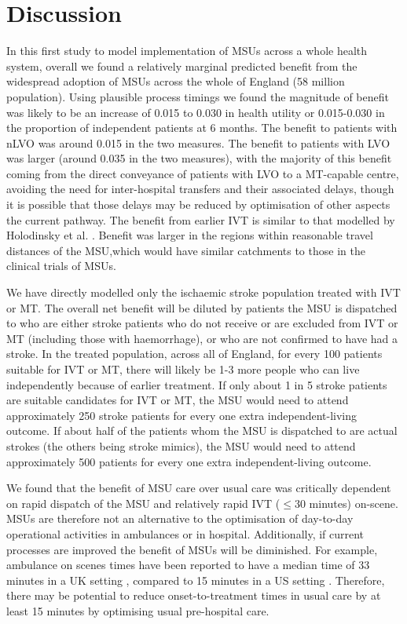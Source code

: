 \section{Discussion}


In this first study to model implementation of MSUs across a whole health system, overall we found a relatively marginal predicted benefit from the widespread adoption of MSUs across the whole of England (58 million population). Using plausible process timings we found the magnitude of benefit was likely to be an increase of 0.015 to 0.030 in health utility or 0.015-0.030 in the proportion of independent patients at 6 months. The benefit to patients with nLVO was around 0.015 in the two measures. The benefit to patients with LVO was larger (around 0.035 in the two measures), with the majority of this benefit coming from the direct conveyance of patients with LVO to a MT-capable centre, avoiding the need for inter-hospital transfers and their associated delays, though it is possible that those delays may be reduced by optimisation of other aspects the current pathway. The benefit from earlier IVT is similar to that modelled by Holodinsky et al. \cite{holodinsky_jessalyn_k_what_2020}. Benefit was larger in the regions within reasonable travel distances of the MSU,which would have similar catchments to those in the clinical trials of MSUs.

We have directly modelled only the ischaemic stroke population treated with IVT or MT. The overall net benefit will be diluted by patients the MSU is dispatched to who are either stroke patients who do not receive or are excluded from IVT or MT (including those with haemorrhage), or who are not confirmed to have had a stroke. In the treated population, across all of England, for every 100 patients suitable for IVT or MT, there will likely be 1-3 more people who can live independently because of earlier treatment. If only about 1 in 5 stroke patients are suitable candidates for IVT or MT, the MSU would need to attend approximately 250 stroke patients for every one extra independent-living outcome. If about half of the patients whom the MSU is dispatched to are actual strokes (the others being stroke mimics), the MSU would need to attend approximately 500 patients for every one extra independent-living outcome. 

We found that the benefit of MSU care over usual care was critically dependent on rapid dispatch of the MSU and relatively rapid IVT ($\leq$30 minutes) on-scene. MSUs are therefore not an alternative to the optimisation of day-to-day operational activities in ambulances or in hospital. Additionally, if current processes are improved the benefit of MSUs will be diminished. For example, ambulance on scenes times have been reported to have a median time of 33 minutes in a UK setting \cite{mcclelland_what_2023}, compared to 15 minutes in a US setting \cite{patel_evaluation_2014}. Therefore, there may be potential to reduce onset-to-treatment times in usual care by at least 15 minutes by optimising usual pre-hospital care.

